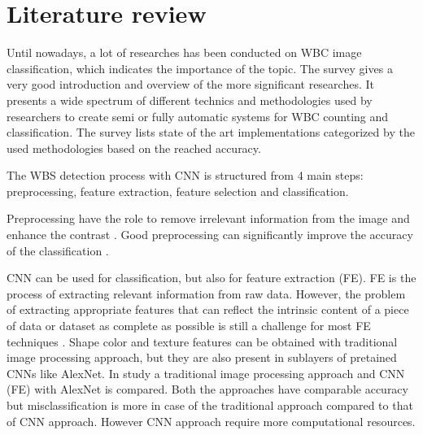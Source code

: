 \section{Literature review}
Until nowadays, a lot of researches has been conducted on WBC image classification, which indicates the importance of the topic.
The  survey gives a very good introduction and overview of the more significant researches. It presents a wide spectrum of different technics and methodologies used by researchers to create semi or fully automatic systems for WBC counting and classification. The survey lists state of the art implementations categorized by the used methodologies based on the reached accuracy.

The WBS detection process with CNN is structured from 4 main steps: preprocessing, feature extraction, feature selection and classification.

Preprocessing have the role to remove irrelevant information from the image and enhance the contrast 
. Good preprocessing can significantly improve the accuracy of the classification 
.

CNN can be used for classification, but also for feature extraction (FE). FE is the process of extracting relevant information from raw data. However, the problem of extracting appropriate features that can reflect the intrinsic content of a piece of data or dataset as complete as possible is still a challenge for most FE techniques
. Shape color and texture features can be obtained with traditional image processing approach, but they are also present in sublayers of pretained CNNs like AlexNet.
In 
study a traditional image processing approach and CNN (FE) with AlexNet is compared. Both the approaches have comparable accuracy but misclassification is more in case of the traditional approach compared to that of CNN approach. However
 CNN approach require more computational resources.

